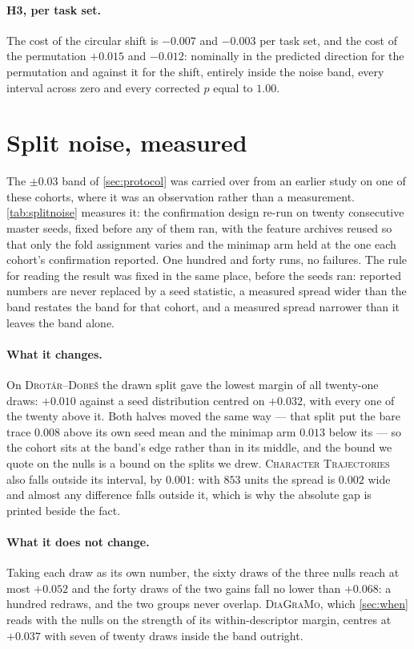 \documentclass{article}
\begin{document}
\paragraph{H3, per task set.} The cost of the circular shift is $-0.007$ and $-0.003$ per task set,
and the cost of the permutation $+0.015$ and $-0.012$: nominally in the predicted direction for the
permutation and against it for the shift, entirely inside the noise band, every interval across zero
and every corrected $p$ equal to $1.00$.

\section{Split noise, measured}
\label{sec:splitnoise-appendix}



The $\pm 0.03$ band of \cref{sec:protocol} was carried over from an earlier study on one of these
cohorts, where it was an observation rather than a measurement. \cref{tab:splitnoise} measures it:
the confirmation design re-run on twenty consecutive master seeds, fixed before any of them ran,
with the feature archives reused so that only the fold assignment varies and the minimap arm held
at the one each cohort's confirmation reported. One hundred and forty runs, no failures. The rule
for reading the result was fixed in the same place, before the seeds ran: reported numbers are
never replaced by a seed statistic, a measured spread wider than the band restates the band for
that cohort, and a measured spread narrower than it leaves the band alone.

\paragraph{What it changes.} On \textsc{Drot\'ar--Dobe\v{s}} the drawn split gave the lowest margin
of all twenty-one draws: $+0.010$ against a seed distribution centred on $+0.032$, with every one
of the twenty above it. Both halves moved the same way --- that split put the bare trace $0.008$
above its own seed mean and the minimap arm $0.013$ below its --- so the cohort sits at the band's
edge rather than in its middle, and the bound we quote on the nulls is a bound on the splits we
drew. \textsc{Character Trajectories} also falls outside its interval, by $0.001$: with $853$ units
the spread is $0.002$ wide and almost any difference falls outside it, which is why the absolute
gap is printed beside the fact.

\paragraph{What it does not change.} Taking each draw as its own number, the sixty draws of the
three nulls reach at most $+0.052$ and the forty draws of the two gains fall no lower than
$+0.068$: a hundred redraws, and the two groups never overlap. \textsc{DiaGraMo}, which
\cref{sec:when} reads with the nulls on the strength of its within-descriptor margin, centres at
$+0.037$ with seven of twenty draws inside the band outright.
\end{document}
